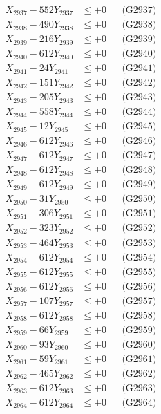 \documentclass[a4paper,10pt]{article}
\begin{document}
{\begin{align}
X_{2937} - 552Y_{2937} &\leq +0 && \text{(G2937)} \\
X_{2938} - 490Y_{2938} &\leq +0 && \text{(G2938)} \\
X_{2939} - 216Y_{2939} &\leq +0 && \text{(G2939)} \\
X_{2940} - 612Y_{2940} &\leq +0 && \text{(G2940)} \\
\allowbreak
X_{2941} - 24Y_{2941} &\leq +0 && \text{(G2941)} \\
X_{2942} - 151Y_{2942} &\leq +0 && \text{(G2942)} \\
X_{2943} - 205Y_{2943} &\leq +0 && \text{(G2943)} \\
X_{2944} - 558Y_{2944} &\leq +0 && \text{(G2944)} \\
X_{2945} - 12Y_{2945} &\leq +0 && \text{(G2945)} \\
X_{2946} - 612Y_{2946} &\leq +0 && \text{(G2946)} \\
X_{2947} - 612Y_{2947} &\leq +0 && \text{(G2947)} \\
X_{2948} - 612Y_{2948} &\leq +0 && \text{(G2948)} \\
X_{2949} - 612Y_{2949} &\leq +0 && \text{(G2949)} \\
X_{2950} - 31Y_{2950} &\leq +0 && \text{(G2950)} \\
\allowbreak
X_{2951} - 306Y_{2951} &\leq +0 && \text{(G2951)} \\
X_{2952} - 323Y_{2952} &\leq +0 && \text{(G2952)} \\
X_{2953} - 464Y_{2953} &\leq +0 && \text{(G2953)} \\
X_{2954} - 612Y_{2954} &\leq +0 && \text{(G2954)} \\
X_{2955} - 612Y_{2955} &\leq +0 && \text{(G2955)} \\
X_{2956} - 612Y_{2956} &\leq +0 && \text{(G2956)} \\
X_{2957} - 107Y_{2957} &\leq +0 && \text{(G2957)} \\
X_{2958} - 612Y_{2958} &\leq +0 && \text{(G2958)} \\
X_{2959} - 66Y_{2959} &\leq +0 && \text{(G2959)} \\
X_{2960} - 93Y_{2960} &\leq +0 && \text{(G2960)} \\
\allowbreak
X_{2961} - 59Y_{2961} &\leq +0 && \text{(G2961)} \\
X_{2962} - 465Y_{2962} &\leq +0 && \text{(G2962)} \\
X_{2963} - 612Y_{2963} &\leq +0 && \text{(G2963)} \\
X_{2964} - 612Y_{2964} &\leq +0 && \text{(G2964)} \\

\end{align}}
\end{document}
